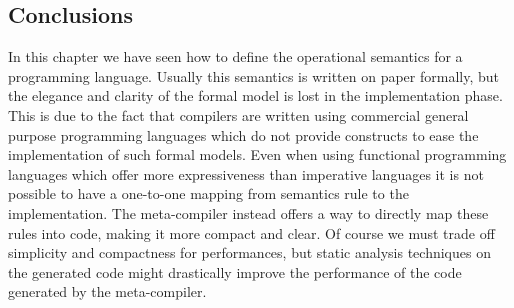 \subsection{Conclusions}

In this chapter we have seen how to define the operational semantics for a programming language. Usually this semantics is written on paper formally, but the elegance and clarity of the formal model is lost in the implementation phase. This is due to the fact that compilers are written using commercial general purpose programming languages which do not provide constructs to ease the implementation of such formal models. Even when using functional programming languages which offer more expressiveness than imperative languages it is not possible to have a one-to-one mapping from semantics rule to the implementation. The meta-compiler instead offers a way to directly map these rules into code, making it more compact and clear. Of course we must trade off simplicity and compactness for performances, but static analysis techniques on the generated code might drastically improve the performance of the code generated by the meta-compiler.